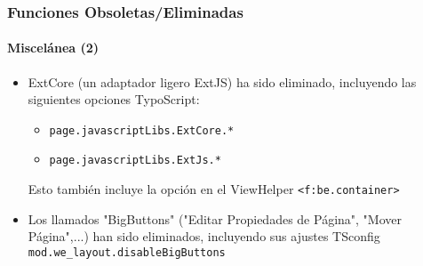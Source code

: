 \begin{frame}[fragile]
	\frametitle{Funciones Obsoletas/Eliminadas}
	\framesubtitle{Miscelánea (2)}

	\begin{itemize}

		\item ExtCore (un adaptador ligero ExtJS) ha sido eliminado, incluyendo las siguientes opciones TypoScript:

			\begin{itemize}
				\item \texttt{page.javascriptLibs.ExtCore.*}
				\item \texttt{page.javascriptLibs.ExtJs.*}
			\end{itemize}

			Esto también incluye la opción en el ViewHelper \texttt{<f:be.container>}

		\item Los llamados "BigButtons" ("Editar Propiedades de Página", "Mover Página",...) han sido eliminados,
			incluyendo sus ajustes TSconfig \texttt{mod.we\_layout.disableBigButtons}

	\end{itemize}

\end{frame}



